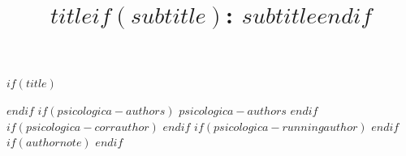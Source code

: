 $if(title)$
\title{$title$$if(subtitle)$: $subtitle$$endif$}
$endif$
$if(psicologica-authors)$
$psicologica-authors$
$endif$
$if(psicologica-corrauthor)$
$endif$
$if(psicologica-runningauthor)$
$endif$
$if(authornote)$
$endif$
\date{}
